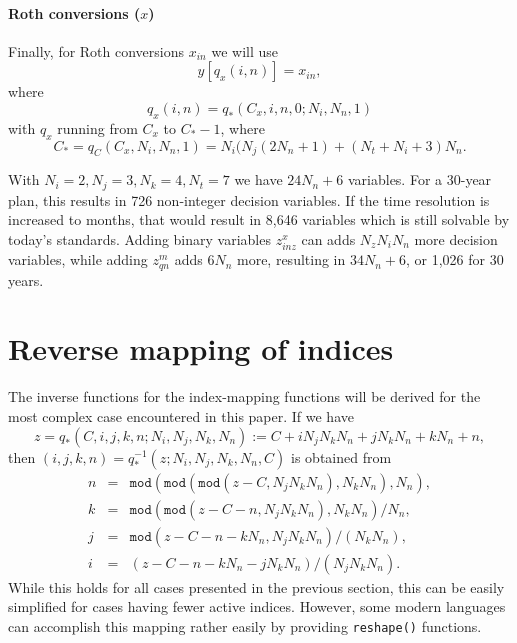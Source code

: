 \documentclass{report}[fleqn,11pt]
\begin{document}
\paragraph*{Roth conversions (\boldmath$x$)}
Finally, for Roth conversions $x_{in}$ we will use
\begin{equation}
	y[q_x(i, n)] = x_{i n},
\end{equation}
where
\begin{equation}
	q_x(i, n) = q_*(C_x, i, n, 0; N_i, N_n, 1)
\end{equation}
with $q_x$ running from $C_x$ to $C_* - 1$, where
\begin{equation}
	\label{Eq:Cstar}
	C_* = q_C(C_x, N_i, N_n, 1) = N_i(N_j(2N_n + 1) + (N_t + N_i + 3) N_n.
\end{equation}

With $N_i = 2, N_j = 3, N_k = 4, N_t = 7$ we have $24 N_n + 6$ variables. For
a 30-year plan, this results in 726 non-integer decision variables.
If the time resolution is increased to
months, that would result in 8,646 variables which is still solvable by today's standards.
Adding binary variables $z^x_{inz}$ can adds $N_zN_iN_n$ more decision variables,
while adding $z^m_{qn}$ adds $6N_n$ more, resulting in $34 N_n + 6$, or 1,026 for 30 years.

\section{Reverse mapping of indices}
The inverse functions for the index-mapping functions will be derived for the
most complex case encountered in this paper.
If we have
\begin{equation}
	z = q_*(C, i, j, k, n; N_i, N_j, N_k, N_n) := C + iN_jN_kN_n + jN_kN_n + kN_n + n,
\end{equation}
then $(i, j, k, n) = q_*^{-1}(z; N_i, N_j, N_k, N_n, C)$ is obtained from
\begin{eqnarray}
	n &=& \texttt{mod}(\texttt{mod}(\texttt{mod}(z - C, N_jN_kN_n), N_kN_n), N_n), \nonumber \\
	k &=& \texttt{mod}(\texttt{mod}(z - C - n, N_jN_kN_n), N_kN_n)/N_n, \nonumber \\
	j &=& \texttt{mod}(z - C - n - kN_n, N_jN_kN_n)/(N_kN_n), \nonumber \\
	i &=& (z - C - n - kN_n - jN_kN_n)/(N_jN_kN_n).
\end{eqnarray}
While this holds for all cases presented in the previous section, this can be easily simplified
for cases having fewer active indices. However, some modern languages can accomplish this
mapping rather easily by providing \texttt{reshape()} functions.
\end{document}
